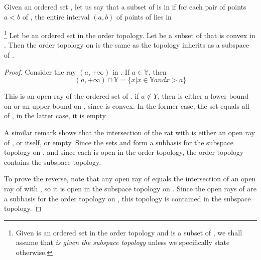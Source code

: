 \begin{definition}[convex]\label{def:Convex}
      Given an ordered set , let us say that a subset  of  is  in  if for each pair of points $ a < b $ of , the entire interval $ (a,b) $ of points of  lies in 
\end{definition}

\begin{theorem}\footnote{
      Given  is an ordered set in the order topology and  is a subset of , we shall assume that  \textit{
            is given the subspace topology
      } unless we specifically state otherwise.
}
      Let  be an ordered set in the order topology. Let  be a subset of  that is convex in . Then the order topology on  is the same as the topology  inherits as a subspace of .
\end{theorem}

\begin{proof}
      Consider the ray $ (a,+\infty) $ in . If $ a \in \mathbb{Y} $, then
      \begin{equation*}
            (a,+\infty) \cap \mathbb{Y} = \{
                  x | x \in \mathbb{Y} and x > a      
            \}
      \end{equation*}

      This is an open ray of the ordered set of . if $ a \notin Y $, then  is either a lower bound on  or an upper bound on , since  is convex. In the former case, the set  equals all of , in the latter case, it is empty.

      A similar remark shows that the intersection of the rat  with  is either an open ray of , or  itself, or empty. Since the sets  and  form a subbasis for the subspace topology on , and since each is open in the order topology, the order topology contains the subspace topology.

      To prove the reverse, note that any open ray of  equals the intersection of an open ray of  with , so it is open in the subspace topology on . Since the open rays of  are a subbasis for the order topology on , this topology is contained in the subspace topology.
\end{proof}